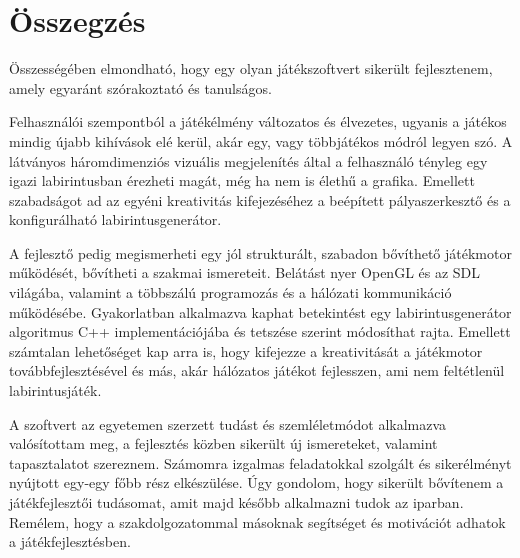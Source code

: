 \chapter{Összegzés} %
\label{ch:sum}

Összességében elmondható, hogy egy olyan játékszoftvert sikerült fejlesztenem, amely egyaránt szórakoztató és tanulságos.

Felhasználói szempontból a játékélmény változatos és élvezetes, ugyanis a játékos mindig újabb kihívások elé kerül, akár egy, vagy többjátékos módról legyen szó. A látványos háromdimenziós vizuális megjelenítés által a felhasználó tényleg egy igazi labirintusban érezheti magát, még ha nem is élethű a grafika. Emellett szabadságot ad az egyéni kreativitás kifejezéséhez a beépített pályaszerkesztő és a konfigurálható labirintusgenerátor.

A fejlesztő pedig megismerheti egy jól strukturált, szabadon bővíthető játékmotor működését, bővítheti a szakmai ismereteit. Belátást nyer OpenGL és az SDL világába, valamint a többszálú programozás és a hálózati kommunikáció működésébe. Gyakorlatban alkalmazva kaphat betekintést egy labirintusgenerátor algoritmus C++ implementációjába és tetszése szerint módosíthat rajta. Emellett számtalan lehetőséget kap arra is, hogy kifejezze a kreativitását a játékmotor továbbfejlesztésével és más, akár hálózatos játékot fejlesszen, ami nem feltétlenül labirintusjáték.

A szoftvert az egyetemen szerzett tudást és szemléletmódot alkalmazva valósítottam meg, a fejlesztés közben sikerült új ismereteket, valamint tapasztalatot szereznem. Számomra izgalmas feladatokkal szolgált és sikerélményt nyújtott egy-egy főbb rész elkészülése. Úgy gondolom, hogy sikerült bővítenem a játékfejlesztői tudásomat, amit majd később alkalmazni tudok az iparban. Remélem, hogy a szakdolgozatommal másoknak segítséget és motivációt adhatok a játékfejlesztésben.